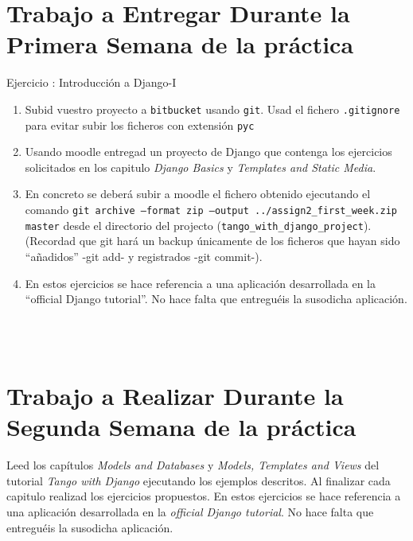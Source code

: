 \documentclass[12pt]{article} %
\newcounter{ejercicioNo}
\begin{document}
\section{Trabajo a Entregar Durante la Primera Semana de la práctica}

\begin{minipage}{\linewidth}
\begin{framed}
\addtocounter{ejercicioNo}{1} 
Ejercicio : Introducción a Django-I
\begin{enumerate}

\item Subid vuestro proyecto a \texttt{bitbucket} usando \texttt{git}. Usad el fichero \texttt{.gitignore} para evitar subir los ficheros con extensión \texttt{pyc} 

\item Usando moodle entregad un proyecto de Django que contenga los ejercicios solicitados en los capitulo \textit{Django Basics} y \textit{Templates and Static Media}.

\item En concreto se deberá subir a moodle el fichero obtenido ejecutando el comando \texttt{git archive --format zip --output ../assign2\_first\_week.zip  master} desde el directorio del projecto (\texttt{tango\_with\_django\_project}). (Recordad que git hará un backup únicamente de los ficheros 
que hayan sido ``añadidos'' -git add- y registrados -git commit-).

\item En estos ejercicios se hace referencia a una aplicación desarrollada en la ``official Django tutorial''. No hace falta que entreguéis la susodicha aplicación.

 \end{enumerate}
\end{framed}
\end{minipage}\\\\




\section{Trabajo a Realizar Durante la Segunda Semana de la práctica}

Leed los capítulos \textit{Models and Databases} y  \textit{Models, Templates and Views}  del tutorial  \textit{Tango with Django} ejecutando los ejemplos descritos.
Al finalizar cada capitulo  realizad los
ejercicios propuestos. En estos ejercicios se hace
referencia a una aplicación desarrollada en la \textit{official Django tutorial}. No hace
falta que entreguéis la susodicha aplicación.
\end{document}
